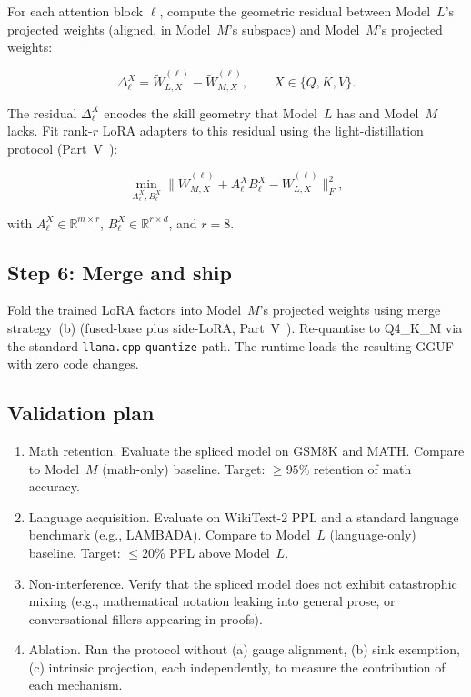 \documentclass[11pt]{article}
\begin{document}
For each attention block $\ell$, compute the geometric residual
between Model~$L$'s projected weights (aligned, in Model~$M$'s
subspace) and Model~$M$'s projected weights:

\begin{equation}
\Delta_\ell^X = \tilde W_{L,X}^{(\ell)} - \tilde W_{M,X}^{(\ell)},
\qquad X \in \{Q,K,V\}.
\label{eq:residual}
\end{equation}

The residual $\Delta_\ell^X$ encodes the skill geometry that Model~$L$
has and Model~$M$ lacks. Fit rank-$r$ LoRA adapters to this residual
using the light-distillation protocol (Part~V~\cite{stewart2026distill}):

\begin{equation}
\min_{A_\ell^X, B_\ell^X} \|\tilde W_{M,X}^{(\ell)} + A_\ell^X B_\ell^X -
\tilde W_{L,X}^{(\ell)}\|_F^2,
\label{eq:lora-fit}
\end{equation}

with $A_\ell^X \in \mathbb{R}^{m \times r}$, $B_\ell^X \in
\mathbb{R}^{r \times d}$, and $r=8$.

\subsection{Step 6: Merge and ship}

Fold the trained LoRA factors into Model~$M$'s projected weights using
merge strategy~(b) (fused-base plus side-LoRA, Part~V~\cite{stewart2026distill}).
Re-quantise to Q4\_K\_M via the standard \texttt{llama.cpp}
\texttt{quantize} path. The runtime loads the resulting GGUF with zero
code changes.

\subsection{Validation plan}

\begin{enumerate}
\item Math retention. Evaluate the spliced model on GSM8K
 and MATH. Compare to Model~$M$ (math-only) baseline. Target:
 ${\ge}95\%$ retention of math accuracy.

\item Language acquisition. Evaluate on WikiText-2 PPL and
 a standard language benchmark (e.g., LAMBADA). Compare to
 Model~$L$ (language-only) baseline. Target: ${\le}20\%$ PPL
 above Model~$L$.

\item Non-interference. Verify that the spliced model does
 not exhibit catastrophic mixing (e.g., mathematical notation
 leaking into general prose, or conversational fillers appearing
 in proofs).

\item Ablation. Run the protocol without (a) gauge alignment,
 (b) sink exemption, (c) intrinsic projection, each independently, to measure the contribution of each mechanism.
\end{enumerate}
\end{document}
